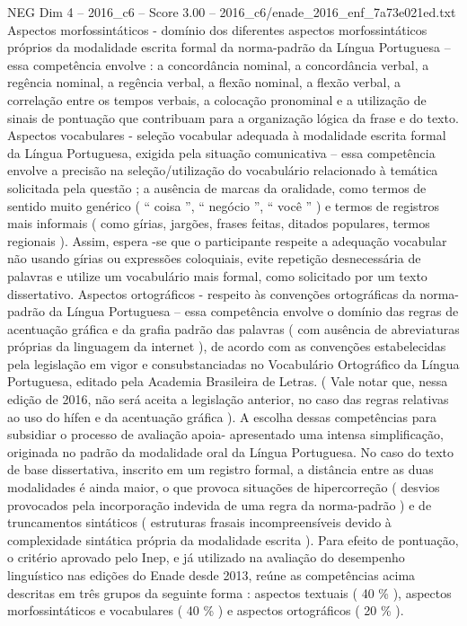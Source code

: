 \begin{textsample}{NEG Dim 4 – 2016\_c6 – Score 3.00 – 2016\_c6/enade\_2016\_enf\_7a73e021ed.txt}
Aspectos morfossintáticos - domínio dos diferentes aspectos morfossintáticos próprios da modalidade escrita formal da norma-padrão da Língua Portuguesa – essa competência envolve : a concordância nominal, a concordância verbal, a regência nominal, a regência verbal, a flexão nominal, a flexão verbal, a correlação entre os tempos verbais, a colocação pronominal e a utilização de sinais de pontuação que contribuam para a organização lógica da frase e do texto.
Aspectos vocabulares - seleção vocabular adequada à modalidade escrita formal da Língua Portuguesa, exigida pela situação comunicativa – essa competência envolve a precisão na seleção/utilização do vocabulário relacionado à temática solicitada pela questão ; a ausência de marcas da oralidade, como termos de sentido muito genérico ( “ coisa ”, “ negócio ”, “ você ” ) e termos de registros mais informais ( como gírias, jargões, frases feitas, ditados populares, termos regionais ).
Assim, espera -se que o participante respeite a adequação vocabular não usando gírias ou expressões coloquiais, evite repetição desnecessária de palavras e utilize um vocabulário mais formal, como solicitado por um texto dissertativo.
Aspectos ortográficos - respeito às convenções ortográficas da norma-padrão da Língua Portuguesa – essa competência envolve o domínio das regras de acentuação gráfica e da grafia padrão das palavras ( com ausência de abreviaturas próprias da linguagem da internet ), de acordo com as convenções estabelecidas pela legislação em vigor e consubstanciadas no Vocabulário Ortográfico da Língua Portuguesa, editado pela Academia Brasileira de Letras. ( Vale notar que, nessa edição de 2016, não será aceita a legislação anterior, no caso das regras relativas ao uso do hífen e da acentuação gráfica ).
A escolha dessas competências para subsidiar o processo de avaliação apoia- apresentado uma intensa simplificação, originada no padrão da modalidade oral da Língua Portuguesa.
No caso do texto de base dissertativa, inscrito em um registro formal, a distância entre as duas modalidades é ainda maior, o que provoca situações de hipercorreção ( desvios provocados pela incorporação indevida de uma regra da norma-padrão ) e de truncamentos sintáticos ( estruturas frasais incompreensíveis devido à complexidade sintática própria da modalidade escrita ).
Para efeito de pontuação, o critério aprovado pelo Inep, e já utilizado na avaliação do desempenho linguístico nas edições do Enade desde 2013, reúne as competências acima descritas em três grupos da seguinte forma : aspectos textuais ( 40 \% ), aspectos morfossintáticos e vocabulares ( 40 \% ) e aspectos ortográficos ( 20 \% ).

\end{textsample}
